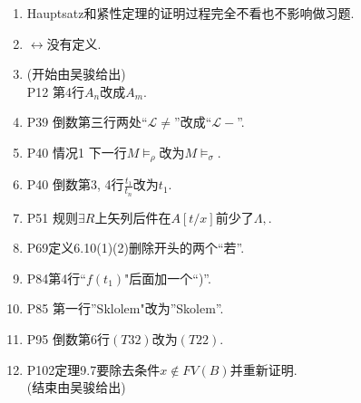 \documentclass{article}
\begin{document}
\begin{enumerate}
\item Hauptsatz和紧性定理的证明过程完全不看也不影响做习题. 

\item $\leftrightarrow$没有定义. 
\item (开始由吴骏给出)\\P12 第4行$A_n$改成$A_m$. 
\item P39 倒数第三行两处``$\mathscr{L}\ne$''改成``$\mathscr{L}-$''. 
\item P40 情况1 下一行$M\models_\rho$改为$M\models_\sigma$. 
\item P40 倒数第3, 4行$\frac{t_1}{t_n}$改为$t_1$. 
\item P51 规则$\exists R$上矢列后件在$A[t/x]$前少了$\Lambda, $. 
\item P69定义6.10(1)(2)删除开头的两个``若''. 
\item P84第4行``$f(t_1)$"后面加一个``)''. 
\item P85 第一行''Sklolem"改为''Skolem''. 
\item P95 倒数第6行$(T32)$改为$(T22)$. 
\item P102定理9.7要除去条件$x\notin FV(B)$并重新证明. \\(结束由吴骏给出)






\end{enumerate}
\end{document}
